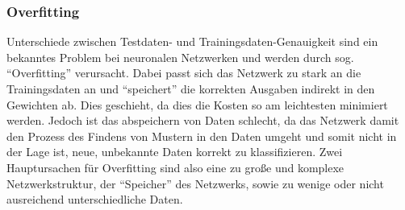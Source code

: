 \documentclass[10pt]{article}
\newcommand{\form}[1]{#1} %
\newcommand{\feng}[1]{{#1}}
\newcommand{\sig}{\textrm{sig}}
\begin{document}
	


\subsubsection{Overfitting} \label{section:overfitting}

Unterschiede zwischen Testdaten- und Trainingsdaten-Genauigkeit sind ein bekanntes Problem bei neuronalen Netzwerken und werden durch sog. \enquote{Overfitting} verursacht.
Dabei passt sich das Netzwerk zu stark an die Trainingsdaten an und \enquote{speichert} die korrekten Ausgaben indirekt in den Gewichten ab.
Dies geschieht, da dies die Kosten so am leichtesten minimiert werden.
Jedoch ist das abspeichern von Daten schlecht, da das Netzwerk damit den Prozess des Findens von Mustern in den Daten umgeht und somit nicht in der Lage ist, neue, unbekannte Daten korrekt zu klassifizieren. %
Zwei Hauptursachen für Overfitting sind also eine zu große und komplexe Netzwerkstruktur, der \enquote{Speicher} des Netzwerks, sowie zu wenige oder nicht ausreichend unterschiedliche Daten.
 
\end{document}
